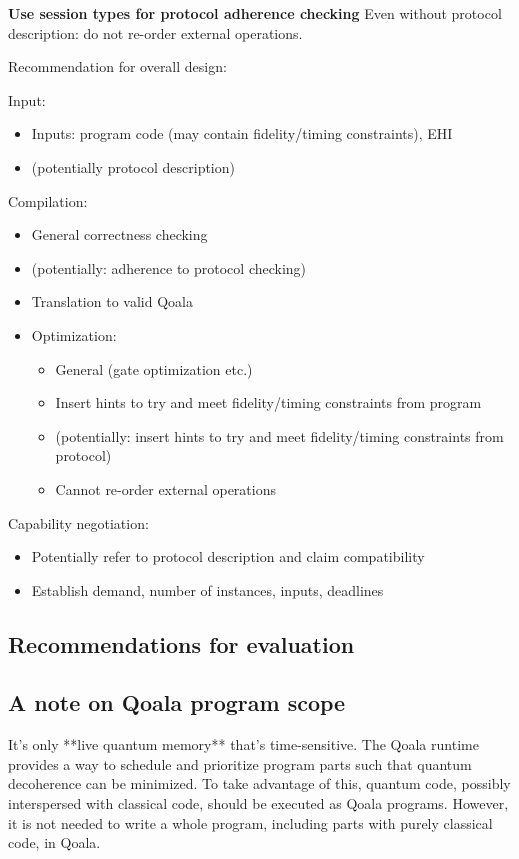 \textbf{Use session types for protocol adherence checking}
Even without protocol description: do not re-order external operations.



Recommendation for overall design:

Input:
\begin{itemize}
  \item Inputs: program code (may contain fidelity/timing constraints), EHI
  \item (potentially protocol description)
\end{itemize}

Compilation:
\begin{itemize}
  \item General correctness checking
  \item (potentially: adherence to protocol checking)
  \item Translation to valid Qoala
  \item Optimization:
    \begin{itemize}
      \item General (gate optimization etc.)
      \item Insert hints to try and meet fidelity/timing constraints from program
      \item (potentially: insert hints to try and meet fidelity/timing constraints from protocol)
      \item Cannot re-order external operations
    \end{itemize}
\end{itemize}

Capability negotiation:
\begin{itemize}
  \item Potentially refer to protocol description and claim compatibility
  \item Establish demand, number of instances, inputs, deadlines
\end{itemize}


\subsection{Recommendations for evaluation}



\subsection{A note on Qoala program scope}
It's only **live quantum memory** that's time-sensitive.
The Qoala runtime provides a way to schedule and prioritize program parts such that quantum decoherence can be minimized.
To take advantage of this, quantum code, possibly interspersed with classical code, should be executed as Qoala programs.
However, it is not needed to write a whole program, including parts with purely classical code, in Qoala.